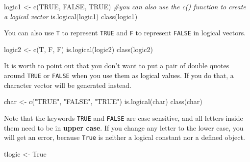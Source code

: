 \documentclass[
]{book}
\newenvironment{Shaded}{\begin{snugshade}}{\end{snugshade}}
\newcommand{\CommentTok}[1]{\textcolor[rgb]{0.56,0.35,0.01}{\textit{#1}}}
\newcommand{\ConstantTok}[1]{\textcolor[rgb]{0.00,0.00,0.00}{#1}}
\newcommand{\FunctionTok}[1]{\textcolor[rgb]{0.00,0.00,0.00}{#1}}
\newcommand{\NormalTok}[1]{#1}
\newcommand{\OtherTok}[1]{\textcolor[rgb]{0.56,0.35,0.01}{#1}}
\newcommand{\StringTok}[1]{\textcolor[rgb]{0.31,0.60,0.02}{#1}}
\begin{document}
\begin{Shaded}
\begin{Highlighting}[]
\NormalTok{logic1 }\OtherTok{\textless{}{-}} \FunctionTok{c}\NormalTok{(}\ConstantTok{TRUE}\NormalTok{, }\ConstantTok{FALSE}\NormalTok{, }\ConstantTok{TRUE}\NormalTok{) }\CommentTok{\#you can also use the c() function to create a logical vector}
\FunctionTok{is.logical}\NormalTok{(logic1)}
\FunctionTok{class}\NormalTok{(logic1)}
\end{Highlighting}
\end{Shaded}

You can also use \texttt{T} to represent \texttt{TRUE} and \texttt{F} to represent \texttt{FALSE} in logical vectors.

\begin{Shaded}
\begin{Highlighting}[]
\NormalTok{logic2 }\OtherTok{\textless{}{-}} \FunctionTok{c}\NormalTok{(T, F, F)}
\FunctionTok{is.logical}\NormalTok{(logic2)}
\FunctionTok{class}\NormalTok{(logic2)}
\end{Highlighting}
\end{Shaded}

It is worth to point out that you don't want to put a pair of double quotes around \texttt{TRUE} or \texttt{FALSE} when you use them as logical values. If you do that, a character vector will be generated instead.

\begin{Shaded}
\begin{Highlighting}[]
\NormalTok{char }\OtherTok{\textless{}{-}} \FunctionTok{c}\NormalTok{(}\StringTok{"TRUE"}\NormalTok{, }\StringTok{"FALSE"}\NormalTok{, }\StringTok{"TRUE"}\NormalTok{)}
\FunctionTok{is.logical}\NormalTok{(char)}
\FunctionTok{class}\NormalTok{(char)}
\end{Highlighting}
\end{Shaded}

Note that the keywords \texttt{TRUE} and \texttt{FALSE} are case sensitive, and all letters inside them need to be in \textbf{upper case}. If you change any letter to the lower case, you will get an error, because \texttt{True} is neither a logical constant nor a defined object.

\begin{Shaded}
\begin{Highlighting}[]
\NormalTok{tlogic }\OtherTok{\textless{}{-}}\NormalTok{ True}
\end{Highlighting}
\end{Shaded}
\end{document}
